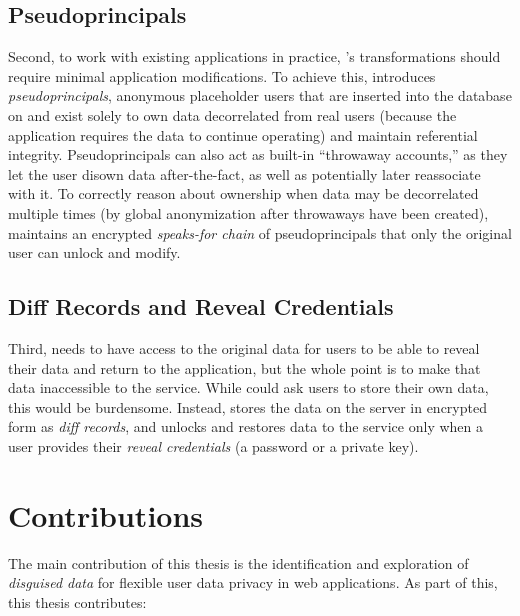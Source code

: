 %
\subsection{Pseudoprincipals}
Second, to work with existing applications in practice, \sys's \xxing
transformations should require minimal application modifications.
%
To achieve this, \sys introduces \emph{pseudoprincipals}, anonymous placeholder
users that are inserted into the database on \xxing and exist solely to own data
decorrelated from real users (\eg because the application requires the data to
continue operating) and maintain referential integrity.
%
Pseudoprincipals can also act as built-in ``throwaway accounts,'' as they let
the user disown data after-the-fact, as well as potentially later reassociate
with it.
%
To correctly reason about ownership when data may be decorrelated multiple times
(\eg by global anonymization after throwaways have been created), \sys maintains
an encrypted \emph{speaks-for chain} of pseudoprincipals that only the original user
can unlock and modify.
%

%
\subsection{Diff Records and Reveal Credentials}
Third, \sys needs to have access to the original data for users to be able to
reveal their data and return to the application, but the whole point is to make
that data inaccessible to the service.
%
While \sys could ask users to store their own \xxed data, this would be
burdensome.
%
Instead, \sys stores the \xxed data on the server in encrypted form as
\emph{diff records}, and unlocks
and restores data to the service only when a user provides their \emph{reveal
credentials} (\eg a password or a private key).

%
\section{Contributions}
%
The main contribution of this thesis is the identification and exploration of
\emph{disguised data} for flexible user data privacy in web applications. As
part of this, this thesis contributes:

